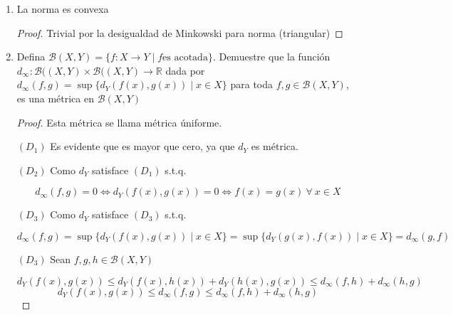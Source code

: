 \documentclass[12pt]{article}
\newcommand\R{\ensuremath{\mathbb{R}}}
\begin{document}
\begin{enumerate}[label=\textbf{\arabic*}.]
$$\|f\|_{r,p} = \|f\|_{p} + \|f^{\prime}\|_{p} + \ldots + \|f^{r}\|_{p}$$

Demuestra que $C^r_p [a, b] = (C^r[a, b],{\norm{\cdot}}_{r,p})$ es un espacio normado.

\begin{proof}
    Sean $f,g \in C^r[a, b]. $ Notemos que, $\forall \: 0 \leqslant s \leqslant r$

    $${\left(f^s + g^s \right)}^{\prime} = {f}^{s+1}+{g}^{s+1}$$
    $$\norm{f+g}_{r,p} = \sum_{s=0}^{r} \norm{(f+g)^s}_p = \sum_{s=0}^{r} \norm{f^s+g^s}_p \leqslant \sum_{s=0}^{r} \norm{f^s}_p + \sum_{s=0}^{r} \norm{g^s}_p = \norm{f}_{r,p}+\norm{g}_{r,p}$$

    Las demás propiedades son triviales. $\therefore \norm{f}_{r,p}$ es norma. 
\end{proof}

\item La norma es convexa

\begin{proof}
    Trivial por la desigualdad de Minkowski para norma (triangular)
\end{proof}

\item Defina $\mathcal{B}(X, Y ) = \{f : X \to Y \mid f \text{es acotada} \}$. Demuestre que
la función $d_\infty : \mathcal{B}((X, Y ) \times \mathcal{B}((X, Y ) \to \R$ dada por $d_\infty(f,g) =
\sup \{d_Y (f(x), g(x)) \mid x \in X \}$ para toda $f,g \in \mathcal{B}(X, Y ) $, es una métrica en $\mathcal{B}(X, Y)$

\begin{proof}
    Esta métrica se llama métrica úniforme. 

    $(D_1)$ Es evidente que es mayor que cero, ya que $d_Y$ es métrica.

    $(D_2)$ Como $d_Y$ satisface $(D_1)$ s.t.q.

    $$d_\infty(f,g) = 0 \Leftrightarrow d_Y(f(x),g(x)) = 0 \Leftrightarrow f(x) = g(x) \: \forall \: x \in X$$

    $(D_3)$ Como $d_Y$ satisface $(D_3)$ s.t.q.

    $$d_\infty(f,g) = \sup \{d_Y (f(x), g(x)) \mid x \in X \} = \sup \{d_Y (g(x), f(x)) \mid x \in X \} = d_\infty(g,f) $$

    $(D_3)$ Sean $f,g,h \in \mathcal{B}(X,Y)$

    $$d_Y(f(x),g(x)) \leqslant d_Y(f(x),h(x)) + d_Y(h(x),g(x)) \leqslant d_\infty (f,h) + d_\infty(h,g)$$
    $$d_Y(f(x),g(x)) \leqslant d_\infty(f,g) \leqslant d_\infty (f,h) + d_\infty(h,g)$$


\end{proof}
\end{enumerate}
\end{document}
